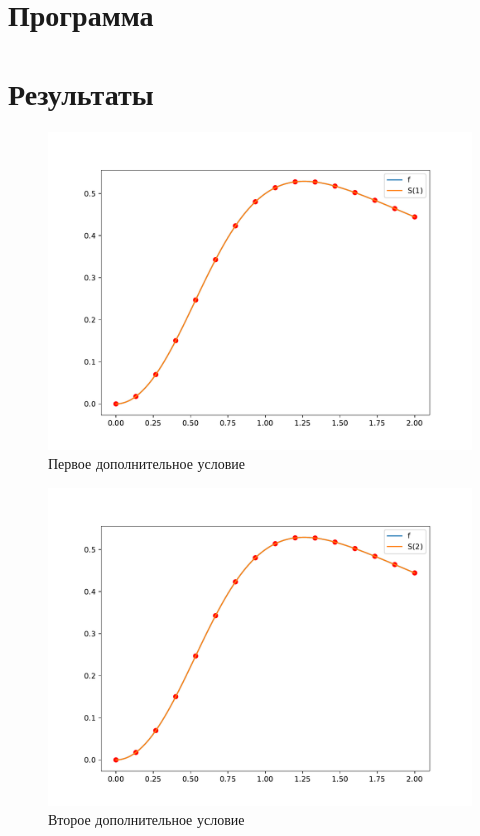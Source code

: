 \documentclass[12pt, a4paper]{article}
\begin{document}
\section{Программа}


	
\section{Результаты}

\begin{figure}[H]
	\centering
	\includegraphics[width=\linewidth]{1.pdf}
	\caption{Первое дополнительное условие}
	\label{fig:case_1}
\end{figure}


\begin{figure}[H]
	\centering
	\includegraphics[width=\linewidth]{2.pdf}
	\caption{Второе дополнительное условие}
	\label{fig:case_2}
\end{figure}
\end{document}
